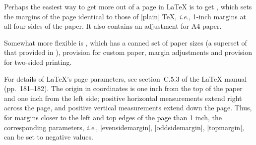 Perhaps the easiest way to get more out of a page in \LaTeX{} is to
get , which sets the margins of the page identical
to those of |plain| \TeX{}, \emph{i.e.}, 1-inch margins at all four
sides of the
paper. It also contains an adjustment for A4 paper.

Somewhat more flexible is , which has a canned set of
paper sizes (a superset of that provided in \LaTeXe{}), provision for
custom paper, margin adjustments and provision for two-sided printing.

For details of \LaTeX{}'s page
parameters, see section~C.5.3 of the
\LaTeX{} manual (pp.~181--182).
The origin in  coordinates is one inch
from the top of the paper and one inch from the left side; positive
horizontal measurements extend
right across the page, and positive vertical measurements extend down
the page. Thus, for margins closer to the left and top edges of the
page than 1 inch, the corresponding parameters, \emph{i.e}.,
\cs|evensidemargin|, \cs|oddsidemargin|, \cs|topmargin|, can be set to
negative values.

